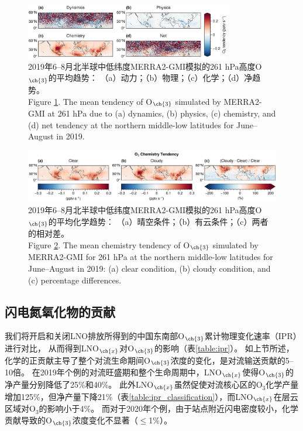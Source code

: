 \begin{figure}[H]
    \centering
    \includegraphics[width=0.8\textwidth]{./figures/uto3_tendency.png}
    \caption{
    2019年6--8月北半球中低纬度MERRA2-GMI模拟的261 hPa高度O$_{\ch{3}}$的平均趋势：
    （a）动力；（b）物理；（c）化学；（d）净趋势。\\
    Figure \ref{fig:uto3_tendency}. The mean tendency of O$_{\ch{3}}$ simulated by MERRA2-GMI at 261 hPa due to (a) dynamics, (b) physics, (c) chemistry, and (d) net tendency at the northern middle-low latitudes for June--August in 2019.
    }
    \label{fig:uto3_tendency}
\end{figure}


\begin{figure}[H]
    \centering
    \includegraphics[width=\textwidth]{./figures/uto3_chem_tendency.png}
    \caption{
    2019年6--8月北半球中低纬度MERRA2-GMI模拟的261 hPa高度O$_{\ch{3}}$的平均化学趋势：
    （a）晴空条件；（b）有云条件；（c）两者的相对差。\\
    Figure \ref{fig:uto3_chem_tendency}. The mean chemistry tendency of O$_{\ch{3}}$ simulated by MERRA2-GMI for 261 hPa at the northern middle-low latitudes for June--August in 2019:
    (a) clear condition, (b) cloudy condition, and (c) percentage differences.
    }
    \label{fig:uto3_chem_tendency}
\end{figure}

\subsection{闪电氮氧化物的贡献} \label{sec:lnox_effects}

我们将开启和关闭LNO排放所得到的中国东南部O$_{\ch{3}}$累计物理变化速率（IPR）进行对比，
从而得到LNO$_{\ch{x}}$对O$_{\ch{3}}$的影响（表\ref{table:ipr}）。
如上节所述，化学的正贡献主导了整个对流生命期间O$_{\ch{3}}$浓度的变化，是对流输送贡献的5--10倍。
在2019年个例的对流旺盛期和整个生命周期中，LNO$_{\ch{x}}$使得O$_{\ch{3}}$的净产量分别降低了25\%和40\%。
此外LNO$_{\ch{x}}$虽然促使对流核心区的O$_3$化学产量增加125\%，但净产量下降21\%（表\ref{table:ipr_classification}），而LNO$_{\ch{x}}$在层云区域对O$_3$的影响小于4\%。
而对于2020年个例，由于站点附近闪电密度较小，化学贡献导致的O$_{\ch{3}}$浓度变化不显著（$\leq$1\%）。


